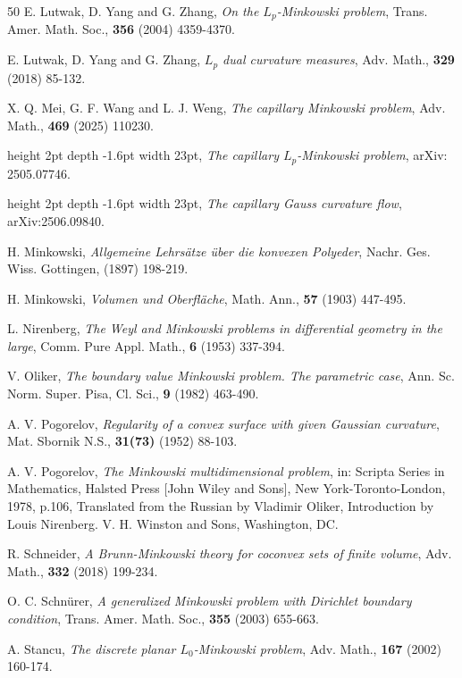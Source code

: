 \documentclass[11pt]{amsart}
\numberwithin{equation} {section}
\numberwithin{equation}{section}
\begin{document}
\begin{thebibliography}{50}
E. Lutwak, D. Yang and G. Zhang, \emph{On the $L_p$-Minkowski
  problem}, Trans. Amer. Math. Soc., {\bf 356} (2004) 4359-4370.

 E. Lutwak, D. Yang and G. Zhang, \emph{$L_p$ dual curvature measures}, Adv. Math., {\bf 329} (2018) 85-132.


 X. Q. Mei, G. F. Wang and L. J. Weng, \emph{The capillary Minkowski problem}, Adv. Math., {\bf 469} (2025) 110230.

\leavevmode\vrule height 2pt depth -1.6pt width 23pt, \emph{The capillary $L_p$-Minkowski problem}, arXiv: 2505.07746.

\leavevmode\vrule height 2pt depth -1.6pt width 23pt, \emph{The capillary Gauss curvature flow}, arXiv:2506.09840.


 H. Minkowski, \emph{Allgemeine Lehrs\"atze \"uber die konvexen Polyeder}, Nachr. Ges. Wiss. Gottingen, (1897) 198-219.

 H. Minkowski, \emph{Volumen und Oberfl\"ache}, Math. Ann., {\bf 57} (1903) 447-495.

 L. Nirenberg, \emph{The Weyl and Minkowski problems in differential geometry in the large}, Comm. Pure Appl. Math., {\bf 6} (1953) 337-394.

 V. Oliker, \emph{The boundary value Minkowski problem. The parametric case}, Ann. Sc. Norm. Super. Pisa, Cl. Sci., {\bf 9} (1982) 463-490.

 A. V. Pogorelov, \emph{Regularity of a convex surface with given Gaussian curvature}, Mat. Sbornik N.S., {\bf 31(73)} (1952) 88-103.

 A. V. Pogorelov, \emph{The Minkowski multidimensional problem}, in: Scripta Series in Mathematics, Halsted Press [John Wiley and Sons], New York-Toronto-London, 1978, p.106, Translated from the Russian by Vladimir Oliker, Introduction by Louis Nirenberg. V. H. Winston and Sons, Washington, DC.

 R. Schneider, \emph{A Brunn-Minkowski theory for coconvex sets of finite volume}, Adv. Math., {\bf 332} (2018) 199-234.

 O. C. Schn\"urer, \emph{A generalized Minkowski problem with Dirichlet boundary condition}, Trans. Amer. Math. Soc., {\bf 355} (2003) 655-663.

A. Stancu, \emph{The discrete planar $L_0$-Minkowski problem}, Adv.
  Math., {\bf 167} (2002) 160-174.


\end{thebibliography}
\end{document}
